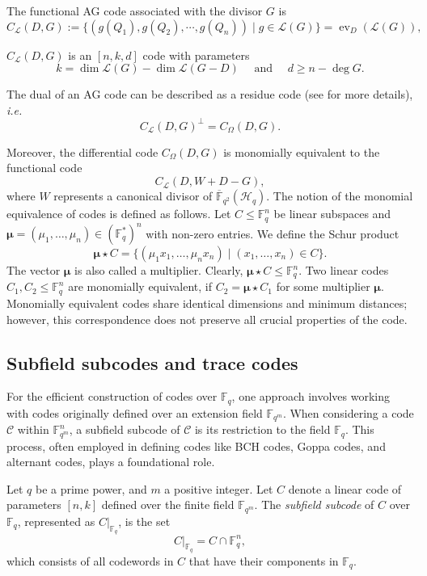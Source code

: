 \documentclass[entropy,article,submit,pdftex,moreauthors]{Definitions/mdpi}
\DeclareMathOperator{\ev}{ev}
\begin{document}
The functional AG code associated with the divisor $G$ is
\[C_{\mathcal{L}}(D,G) := \{(g(Q_1),g(Q_2),\cdots,g(Q_n)) \mid g \in \mathscr{L}(G)\} =\ev_D(\mathscr{L}(G)),\]


\begin{Theorem}\cite[Theorem~2.2.2]{stichtenoth2009algebraic}
	$C_{\mathcal{L}}(D, G)$ is an $[n, k, d]$ code with parameters
	\[
		k=\dim\mathscr{L}(G)-\dim\mathscr{L}(G-D) \quad \text { and } \quad d \geq n-\deg G .
	\]
\end{Theorem}

The dual of an AG code can be described as a residue code (see \cite{stichtenoth2009algebraic} for more details), \emph{i.e.}
\[ C_{\mathcal{L}}(D,G)^{\perp} = C_{\Omega}(D,G).\]


Moreover, the differential code $C_{\Omega}(D, G)$ is monomially equivalent to the functional code 
\[C_{\mathcal{L}}(D, W+D-G), \]
where $W$ represents a canonical divisor of $\overline{\mathbb{F}}_{q^2}(\mathscr{H}_q)$. The notion of the monomial equivalence of codes is defined as follows. Let $C \leq \mathbb{F}_q^n$ be linear subspaces and $\boldsymbol{\mu}=(\mu_1,\ldots,\mu_n) \in (\mathbb{F}_q^*)^n$ with non-zero entries. We define the Schur product
\[\boldsymbol{\mu} \star C = \{(\mu_1x_1, \ldots,\mu_nx_n) \mid (x_1,\ldots,x_n) \in C\}.\]
The vector $\boldsymbol{\mu}$ is also called a multiplier. Clearly, $\boldsymbol{\mu} \star C\leq \mathbb{F}_q^n$. Two linear codes $C_1,C_2 \leq \mathbb{F}_q^n$ are monomially equivalent, if $C_2=\boldsymbol{\mu} \star C_1$ for some multiplier $\boldsymbol{\mu}$. Monomially equivalent codes share identical dimensions and minimum distances; however, this correspondence does not preserve all crucial properties of the code.


\subsection{Subfield subcodes and trace codes}
For the efficient construction of codes over $\mathbb{F}_q$, one approach involves working with codes originally defined over an extension field $\mathbb{F}_{q^m}$. When considering a code $\mathcal{C}$ within $\mathbb{F}_{q^m}^n$, a subfield subcode of $\mathcal{C}$ is its restriction to the field $\mathbb{F}_q$. This process, often employed in defining codes like BCH codes, Goppa codes, and alternant codes, plays a foundational role.

Let $q$ be a prime power, and $m$ a positive integer. Let $C$ denote a linear code of parameters $[n,k]$ defined over the finite field $\mathbb{F}_{q^m}$. The \emph{subfield subcode} of $C$ over $\mathbb{F}_q$, represented as $C|_{\mathbb{F}_q}$, is the set
\[
	C|_{\mathbb{F}_q} = C \cap \mathbb{F}_q^n,
\]
which consists of all codewords in $C$ that have their components in $\mathbb{F}_q$. 
\end{document}
